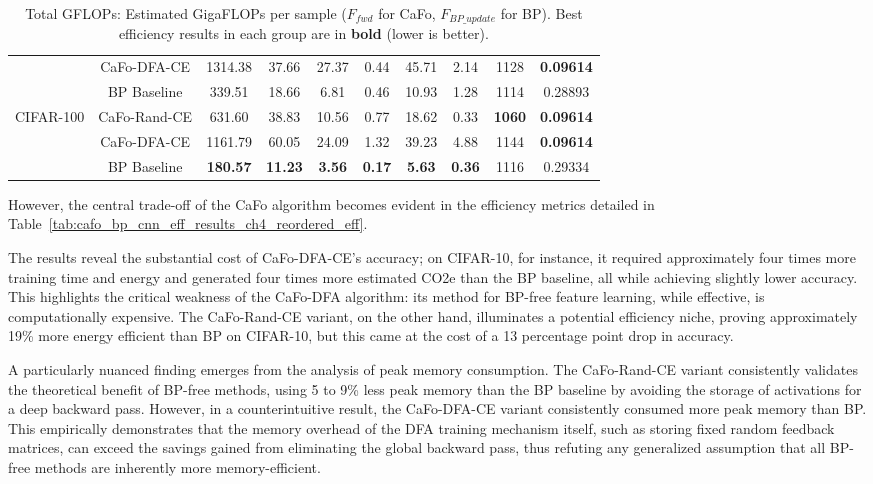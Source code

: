\begin{table}[htbp]
{\begin{tabular}{cc c@{ ± }c c@{ ± }c c@{ ± }c c c}
                                  & CaFo-DFA-CE     & 1314.38 & 37.66 & 27.37 & 0.44 & 45.71 & 2.14 & 1128 & \textbf{0.09614} \\
                                  & BP Baseline     & 339.51 & 18.66 & 6.81 & 0.46 & 10.93 & 1.28 & 1114 & 0.28893 \\
        \midrule
        \multirow{3}{*}{CIFAR-100} & CaFo-Rand-CE    & 631.60 & 38.83 & 10.56 & 0.77 & 18.62 & 0.33 & \textbf{1060} & \textbf{0.09614} \\
                                   & CaFo-DFA-CE     & 1161.79 & 60.05 & 24.09 & 1.32 & 39.23 & 4.88 & 1144 & \textbf{0.09614} \\
                                   & BP Baseline     & \textbf{180.57} & \textbf{11.23} & \textbf{3.56} & \textbf{0.17} & \textbf{5.63} & \textbf{0.36} & 1116 & 0.29334 \\
        \bottomrule
    \end{tabular}%
    }
    \caption*{\footnotesize Total GFLOPs: Estimated GigaFLOPs per sample ($F_{fwd}$ for CaFo, $F_{BP\_update}$ for BP). Best efficiency results in each group are in \textbf{bold} (lower is better).}
\end{table}

However, the central trade-off of the CaFo algorithm becomes evident in the efficiency metrics detailed in Table~\ref{tab:cafo_bp_cnn_eff_results_ch4_reordered_eff}. \pagebreak

The results reveal the substantial cost of CaFo-DFA-CE's accuracy; on CIFAR-10, for instance, it required approximately four times more training time and energy and generated four times more estimated CO2e than the BP baseline, all while achieving slightly lower accuracy. This highlights the critical weakness of the CaFo-DFA algorithm: its method for BP-free feature learning, while effective, is computationally expensive. The CaFo-Rand-CE variant, on the other hand, illuminates a potential efficiency niche, proving approximately 19\% more energy efficient than BP on CIFAR-10, but this came at the cost of a 13 percentage point drop in accuracy. 

A particularly nuanced finding emerges from the analysis of peak memory consumption. The CaFo-Rand-CE variant consistently validates the theoretical benefit of BP-free methods, using 5 to 9\% less peak memory than the BP baseline by avoiding the storage of activations for a deep backward pass. However, in a counterintuitive result, the CaFo-DFA-CE variant consistently consumed more peak memory than BP. This empirically demonstrates that the memory overhead of the DFA training mechanism itself, such as storing fixed random feedback matrices, can exceed the savings gained from eliminating the global backward pass, thus refuting any generalized assumption that all BP-free methods are inherently more memory-efficient.

